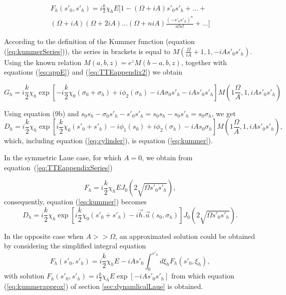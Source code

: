 \documentclass[preprint]{iucr}              %
\newcommand{\inred}[1]{{\color{red}#1}}
\begin{document}
\begin{align}
    \label{eq:TTEappendixSeries}
    F_h(s'_0,s'_h) = i\frac{k}{2}\chi_h E [ 1 - 
    (\Omega+i A) s'_0s'_h + ...+
    \nonumber \\
    (\Omega+iA)(\Omega+2iA)...(\Omega+niA)
    \frac{(-s'_0 s'_h)^n}{n!n!}
    +...]
\end{align}

\inred{According to the definition of the Kummer function (equation (\ref{eq:kummerSeries})), the series \inred{in brackets} is equal to $M(\frac{\Omega}{iA}+1, 1, -iA s'_0 s'_h)$. Using the known relation
$M(a,b,z)=e^z M(b-a,b,z)$, together with equations (\ref{eq:appE}) and (\ref{eq:TTEappendix2}) we obtain

\begin{equation}
    G_h = i\frac{k}{2}\chi_h \exp\left[-i \frac{k}{2} \chi_0 (\sigma_0+\sigma_h)+ i \phi_2(\sigma_h)-i A \sigma_0 s'_h - i A s'_0 s'_h\right] M(1\frac{\Omega}{A},1,i A s'_0 s'_h)
\end{equation}

Using equation (9b) and $s_0s_h-\sigma_0 s'_h - s'_0 s'_h=s_0 s_h - s_0 s'_h = s_0 \sigma_h$, we get
\begin{equation}
    D_h = i \frac{k}{2} \chi_h \exp\left[  i \frac{k}{2} \chi_0 (s'_0+s'_h) - i\phi_1(s_0) + i \phi_2(\sigma_h) - iA s_0 \sigma_h \right] M(1\frac{\Omega}{A},1,i A s'_0 s'_h), 
\end{equation}
which, including equation (\ref{eq:cylinder}), is equation (\ref{eq:kummer}).

In the symmetric Laue case, for which $A=0$, we obtain from equation~(\ref{eq:TTEappendixSeries})

\begin{equation}
    F_h = i \frac{k}{2} \chi_h E J_0(2 \sqrt{\Omega s'_0 s'_h}),
\end{equation}
consequently, equation (\ref{eq:kummer}) becomes
\begin{equation}
    D_h = i \frac{k}{2} \chi_h \exp\left[  i \frac{k}{2} \chi_0 (s'_0+s'_h) - i \vec h . \vec u(s_0,\sigma_h) \right] J_0(2\sqrt{\Omega s'_0 s'_h}).
\end{equation}


In the opposite case when $A >> \Omega$, an approximated solution could be obtained by considering the simplified integral equation
\begin{equation}
        F_h(s'_0,s'_h) = i\frac{k}{2}\chi_h E - i A s'_0 \int_0^{s'_h} d\xi_h F_h(s'_0,\xi_h),
\end{equation}
with solution $F_h(s'_0,s'_h) = i\frac{k}{2}\chi_h E \exp[-i A s'_0 s'_h]$ from which equation (\ref{eq:kummerapprox}) of section \ref{sec:dynamlicalLaue} is obtained.
}
\end{document}

